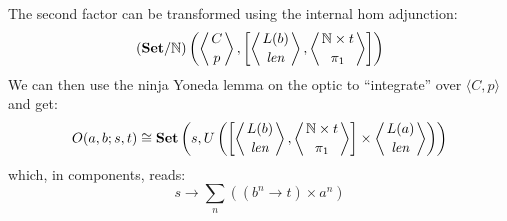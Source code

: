 \documentclass[11pt]{amsart}
\begin{document}
The second factor can be transformed using the internal hom adjunction:
\[ 
(\mathbf{Set}/\mathbb{N})\left(\left \langle {C \atop p} \right \rangle, \left[ \left \langle {L(b) \atop \mathit{len}} \right \rangle, \left \langle {\mathbb{N} \times t \atop \pi_1} \right \rangle \right] \right) \]
We can then use the ninja Yoneda lemma on the optic to ``integrate'' over $\langle C, p \rangle$ and get:
\[ O(a, b; s, t) \cong \mathbf{Set} \left(  s, U\left( 
  \left[ \left \langle {L(b) \atop \mathit{len}} \right \rangle, \left \langle {\mathbb{N} \times t \atop \pi_1} \right \rangle \right] \times \left \langle {L(a) \atop \mathit{len}} \right \rangle \right) \right) \]
which, in components, reads:
\[ s \to \sum_n \left( (b^n \to t) \times a^n \right) \]
\end{document}
